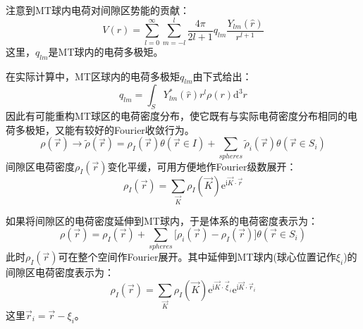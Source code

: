 注意到\textrm{MT}球内电荷对间隙区势能的贡献\cite{Jackson}：
\begin{equation}
	V(r)=\sum_{l=0}^{\infty}\sum_{m=-l}^{l}\dfrac{4\pi}{2l+1}q_{lm}\dfrac{Y_{lm}(\hat r)}{r^{l+1}}
	\label{eq_V-multi-mom}
\end{equation}
这里，$q_{lm}$是\textrm{MT}球内的电荷多极矩。

在实际计算中，\textrm{MT}区球内的电荷多极矩$q_{lm}$由下式给出：
\begin{equation}
	q_{lm}=\int_{S}Y_{lm}^{\ast}(\hat r)r^l\rho(r)\mathrm{d}^3r
	\label{eq_multi-mom}
\end{equation}
因此有可能重构\textrm{MT}球区的电荷密度分布，使它既有与实际电荷密度分布相同的电荷多极矩，又能有较好的\textrm{Fourier}收敛行为。
\begin{equation}
	\rho(\vec r)\rightarrow\tilde\rho(\vec r)=\rho_I(\vec r)\theta(\vec r\in I)+\sum_{spheres}\tilde\rho_i(\vec r)\theta(\vec r\in S_i)
	\label{eq_pseudo-rho}
\end{equation}
间隙区电荷密度$\rho_I(\vec r)$变化平缓，可用方便地作\textrm{Fourier}级数展开：
\begin{equation}
	\rho_I(\vec r)=\sum_{\vec K}\rho_I(\vec K)\mathrm{e}^{\mathrm{i}\vec K\cdot\vec r}
	\label{eq_rho_i_four}
\end{equation}

如果将间隙区的电荷密度延伸到\textrm{MT}球内，于是体系的电荷密度表示为：
\begin{equation}
	\rho(\vec r)=\rho_I(\vec r)+\sum_{spheres}\big[\rho_i(\vec r)-\rho_I(\vec r)\big]\theta(\vec r\in S_i) 
	\label{eq_rho_rean}
\end{equation}
此时$\rho_I(\vec r)$可在整个空间作\textrm{Fourier}展开。其中延伸到\textrm{MT}球内(球心位置记作$\xi_i$)的间隙区电荷密度表示为：
\begin{equation}
	\rho_I(\vec r)=\sum_{\vec K}\rho_I(\vec K)\mathrm{e}^{\mathrm{i}\vec K\cdot\vec\xi_i}\mathrm{e}^{\mathrm{i}\vec K\cdot\vec r_i} 
	\label{eq_rho_i_four_i}
\end{equation}
这里$\vec r_i=\vec r-\xi_i$。

